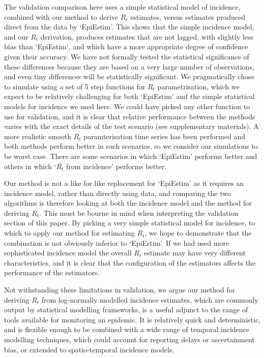\documentclass[10pt,letterpaper]{article}
\begin{document}
The validation comparison here uses a simple statistical model of incidence, combined with our method to derive $R_t$ estimates, versus estimates produced direct from the data by `EpiEstim'. This shows that the simple incidence model, and our $R_t$ derivation, produces estimates that are not lagged, with slightly less bias than `EpiEstim`, and which have a more appropriate degree of confidence given their accuracy. We have not formally tested the statistical significance of these differences because they are based on a very large number of observations, and even tiny differences will be statistically significant. We pragmatically chose to simulate using a set of 5 step functions for $R_t$ parametrisation, which we expect to be relatively challenging for both `EpiEstim' and the simple statistical models for incidence we used here. We could have picked any other function to use for validation, and it is clear that relative performance between the methods varies with the exact details of the test scenario (see supplementary materials). A more realistic smooth $R_t$ paramterisation time series has been performed and both methods perform better in such scenarios, so we consider our simulations to be worst case. There are some scenarios in which `EpiEstim' performs better and others in which `$R_t$ from incidence' performs better.

Our method is not a like for like replacement for `EpiEstim' as it requires an incidence model, rather than directly using data, and comparing the two algorithms is therefore looking at both the incidence model and the method for deriving $R_t$. This must be bourne in mind when interpreting the validation section of this paper. By picking a very simple statistical model for incidence, to which to apply our method for estimating $R_t$, we hope to demonstrate that the combination is not obviously inferior to `EpiEstim'. If we had used more sophisticated incidence model the overall $R_t$ estimate may have very different characteristics, and it is clear that the configuration of the estimators affects the performance of the estimators.

Not withstanding these limitations in validation, we argue our method for deriving $R_t$ from log-normally modelled incidence estimates, which are commonly output by statistical modelling frameworks, is a useful adjunct to the range of tools available for monitoring an epidemic. It is relatively quick and deterministic, and is flexible enough to be combined with a wide range of temporal incidence modelling techniques, which could account for reporting delays or ascertainment bias, or extended to spatio-temporal incidence models.
\end{document}
